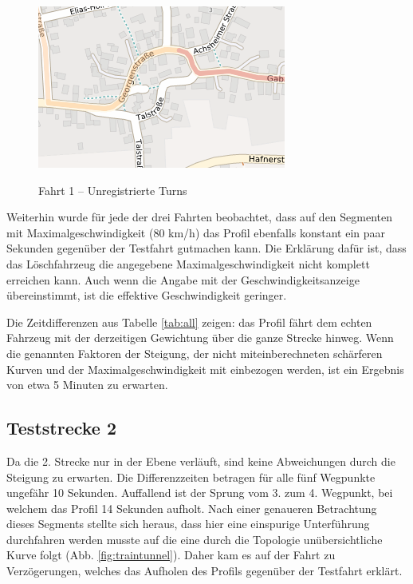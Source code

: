 \begin{figure}[htb]
\centering
\caption{Fahrt 1 -- Unregistrierte Turns}
\label{fig:curve}
\includegraphics[width = 0.50 \textwidth]{../media/Fahrt1_curve.png} \\
\end{figure}

Weiterhin wurde für jede der drei Fahrten beobachtet, dass auf den Segmenten mit Maximalgeschwindigkeit (80 km/h) das Profil ebenfalls konstant ein paar Sekunden gegenüber der Testfahrt gutmachen kann.
Die Erklärung dafür ist, dass das Löschfahrzeug die angegebene Maximalgeschwindigkeit nicht komplett erreichen kann.
Auch wenn die Angabe mit der Geschwindigkeitsanzeige übereinstimmt, ist die effektive Geschwindigkeit geringer.

Die Zeitdifferenzen aus Tabelle \ref{tab:all} zeigen: das Profil fährt dem echten Fahrzeug mit der derzeitigen Gewichtung über die ganze Strecke hinweg.
Wenn die genannten Faktoren der Steigung, der nicht miteinberechneten schärferen Kurven und der Maximalgeschwindigkeit mit einbezogen werden, ist ein Ergebnis von etwa 5 Minuten zu erwarten.

\subsection{Teststrecke 2}

Da die 2. Strecke nur in der Ebene verläuft, sind keine Abweichungen durch die Steigung zu erwarten.
Die Differenzzeiten betragen für alle fünf Wegpunkte ungefähr 10 Sekunden.
Auffallend ist der Sprung vom 3. zum 4. Wegpunkt, bei welchem das Profil 14 Sekunden aufholt.
Nach einer genaueren Betrachtung dieses Segments stellte sich heraus, dass hier eine einspurige Unterführung durchfahren werden musste auf die eine durch die Topologie unübersichtliche Kurve folgt (Abb. \ref{fig:traintunnel}).
Daher kam es auf der Fahrt zu Verzögerungen, welches das Aufholen des Profils gegenüber der Testfahrt erklärt.

